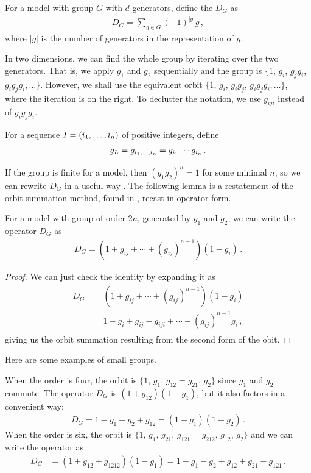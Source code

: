 \begin{defn} For a \classic \dD model with group $G$ with $d$ generators, define the  $D_G$ as
\begin{align}
	D_G = \sum_{g\in G} (-1)^{|g|}g\,,
\end{align}
where $|g|$ is the number of generators in the representation of $g$.
\end{defn}
In two dimensions, we can find the whole group by iterating over the two generators. That is, we apply $g_1$ and $g_2$ sequentially and the group is $\{1$, $g_i$, $g_jg_i$, $g_ig_jg_i, \ldots\}$. However, we shall use the equivalent orbit $\{1$, $g_i$, $g_ig_j$, $g_ig_jg_i,\ldots\}$, where the iteration is on the right. To declutter the notation, we use $g_{iji}$ instead of $g_ig_jg_i$.
\begin{defn} For a sequence $I = (i_1,\ldots, i_n)$ of positive integers, define 
\begin{align}
	g_L = g_{i_1,\ldots, i_n} = g_{i_1}\cdots g_{i_n}\,.
\end{align} 
\end{defn}
If the group is finite for a \classic \twoD model, then $(g_1g_2)^n = 1$ for some minimal $n$, so we can rewrite $D_G$ in a useful way \cite{bousquet2010walks}. The following lemma is a restatement of the orbit summation method, found in \cite[p.~10]{bousquet2010walks}, recast in operator form.
\begin{prop} For a \classic \twoD model with group of order $2n$, generated by $g_1$ and $g_2$, we can write the operator $D_G$ as
\begin{align}
	D_G = (1 + g_{ij} + \cdots + (g_{ij})^{n-1})(1-g_i)\,.
\end{align}
\end{prop}
\begin{proof} We can just check the identity by expanding it as
\begin{align}
	\begin{split}
		D_G &= (1 + g_{ij} + \cdots + (g_{ij})^{n-1})(1-g_i)\\
		        &= 1- g_i + g_{ij}-g_{iji} + \cdots - (g_{ij})^{n-1}g_i\,,
	\end{split}
\end{align}
giving us the orbit summation resulting from the second form of the obit.
\end{proof}
Here are some examples of small groups.
\begin{exa} When the order is four, the orbit is $\{1$, $g_1$, $g_{12} = g_{21}$, $g_2\}$ since $g_1$ and $g_2$ commute. The operator $D_G$ is $(1 + g_{12})(1-g_1)$, but it also factors in a convenient way:
\begin{align}
	D_G = 1 - g_1 - g_2 + g_{12} = (1-g_1)(1-g_2)\,.
\end{align}
When the order is six, the orbit is $\{1$, $g_1$, $g_{21}$, $g_{121}=g_{212}$, $g_{12}$, $g_2\}$ and we can write the operator as 
\begin{align}
	D_G &= (1 + g_{12} + g_{1212})(1-g_1)= 1 -g_1 - g_2 + g_{12} + g_{21}-g_{121}\,.
\end{align}
\end{exa}
